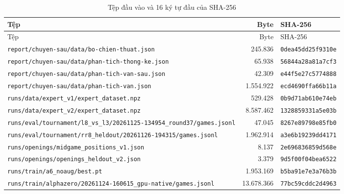\par{\footnotesize
\renewcommand{\arraystretch}{0.95}
\begin{longtable}{p{9cm}rl}
  \caption{Tệp đầu vào và 16 ký tự đầu của SHA-256}\label{tab:cs-minh-chung-vao}\\
    \toprule
    Tệp & Byte & SHA-256 \\
    \midrule
  \endfirsthead
    \toprule
    Tệp & Byte & SHA-256 \\
    \midrule
  \endhead
    \bottomrule
  \endfoot
    \texttt{report/chuyen-sau/data/bo-chien-thuat.json} & 245.836 & \texttt{0dea45dd25f9310e} \\
    \texttt{report/chuyen-sau/data/phan-tich-thong-ke.json} & 65.938 & \texttt{56844a28a81a7cf3} \\
    \texttt{report/chuyen-sau/data/phan-tich-van-sau.json} & 42.309 & \texttt{e44f5e27c5774888} \\
    \texttt{report/chuyen-sau/data/phan-tich-van.json} & 1.554.922 & \texttt{ecd4690ffa66b11a} \\
    \texttt{runs/data/expert\_v1/expert\_dataset.npz} & 529.428 & \texttt{0b9d71ab610e74eb} \\
    \texttt{runs/data/expert\_v2/expert\_dataset.npz} & 8.587.462 & \texttt{1328859331a5e03b} \\
    \texttt{runs/eval/tournament/l8\_vs\_l3/20261125-134954\_round37/games.jsonl} & 47.045 & \texttt{8267e89798e85fb0} \\
    \texttt{runs/eval/tournament/rr8\_heldout/20261126-194315/games.jsonl} & 1.962.914 & \texttt{a3e6b19239dd4171} \\
    \texttt{runs/openings/midgame\_positions\_v1.json} & 8.137 & \texttt{2e696836859d568e} \\
    \texttt{runs/openings/openings\_heldout\_v2.json} & 3.379 & \texttt{9d5f00f04bea6522} \\
    \texttt{runs/train/a6\_noaug/best.pt} & 1.953.169 & \texttt{b5ba91e7e3a76b3b} \\
    \texttt{runs/train/alphazero/20261124-160615\_gpu-native/games.jsonl} & 13.678.366 & \texttt{77bc59cddc2d4963} \\
\end{longtable}
}
